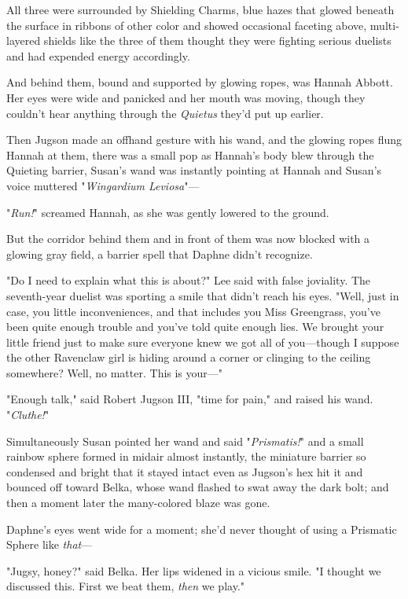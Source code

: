 All three were surrounded by Shielding Charms, blue hazes that glowed beneath 
the surface in ribbons of other color and showed occasional faceting above, 
multi-layered shields like the three of them thought they were fighting serious 
duelists and had expended energy accordingly.

And behind them, bound and supported by glowing ropes, was Hannah Abbott. Her 
eyes were wide and panicked and her mouth was moving, though they couldn't hear 
anything through the \emph{Quietus} they'd put up earlier.

Then Jugson made an offhand gesture with his wand, and the glowing ropes flung 
Hannah at them, there was a small pop as Hannah's body blew through the 
Quieting barrier, Susan's wand was instantly pointing at Hannah and Susan's 
voice muttered "\emph{Wingardium Leviosa}"---

"\emph{Run!}" screamed Hannah, as she was gently lowered to the ground.

But the corridor behind them and in front of them was now blocked with a 
glowing gray field, a barrier spell that Daphne didn't recognize.

"Do I need to explain what this is about?" Lee said with false joviality. The 
seventh-year duelist was sporting a smile that didn't reach his eyes. "Well, 
just in case, you little inconveniences, and that includes you Miss Greengrass, 
you've been quite enough trouble and you've told quite enough lies. We brought 
your little friend just to make sure everyone knew we got all of you---though I 
suppose the other Ravenclaw girl is hiding around a corner or clinging to the 
ceiling somewhere? Well, no matter. This is your---"

"Enough talk," said Robert Jugson III, "time for pain," and raised his wand. 
"\emph{Cluthe!}"

Simultaneously Susan pointed her wand and said "\emph{Prismatis!}" and a small 
rainbow sphere formed in midair almost instantly, the miniature barrier so 
condensed and bright that it stayed intact even as Jugson's hex hit it and 
bounced off toward Belka, whose wand flashed to swat away the dark bolt; and 
then a moment later the many-colored blaze was gone.

Daphne's eyes went wide for a moment; she'd never thought of using a Prismatic 
Sphere like \emph{that}---

"Jugsy, honey?" said Belka. Her lips widened in a vicious smile. "I thought we 
discussed this. First we beat them, \emph{then} we play."

